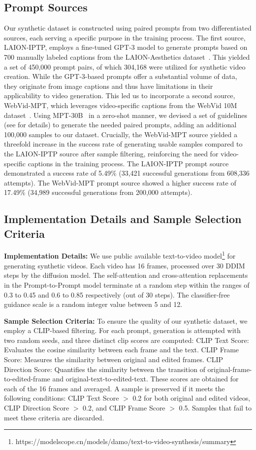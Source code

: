 \subsection{Prompt Sources} 
Our synthetic dataset is constructed using paired prompts from two differentiated sources, each serving a specific purpose in the training process. The first source, LAION-IPTP, employs a fine-tuned GPT-3 model to generate prompts based on 700 manually labeled captions from the LAION-Aesthetics dataset~\cite{brooks2023instructpix2pix}. This yielded a set of 450,000 prompt pairs, of which 304,168 were utilized for synthetic video creation. While the GPT-3-based prompts offer a substantial volume of data, they originate from image captions and thus have limitations in their applicability to video generation. This led us to incorporate a second source, WebVid-MPT, which leverages video-specific captions from the WebVid 10M dataset~\cite{webvid}. Using MPT-30B~\cite{mpt} in a zero-shot manner, we devised a set of guidelines (see  for details) to generate the needed paired prompts, adding an additional 100,000 samples to our dataset. Crucially, the WebVid-MPT source yielded a threefold increase in the success rate of generating usable samples compared to the LAION-IPTP source after sample filtering, reinforcing the need for video-specific captions in the training process. The LAION-IPTP prompt source demonstrated a success rate of 5.49\% (33,421 successful generations from 608,336 attempts). The WebVid-MPT prompt source showed a higher success rate of 17.49\% (34,989 successful generations from 200,000 attempts).

\subsection{Implementation Details and Sample Selection Criteria} 
\noindent\textbf{Implementation Details:} We use public available text-to-video model\footnote{https://modelscope.cn/models/damo/text-to-video-synthesis/summary} for generating synthetic videos. Each video has 16 frames, processed over 30 DDIM~\cite{ddim} steps by the diffusion model. The self-attention and cross-attention replacements in the Prompt-to-Prompt model terminate at a random step within the ranges of 0.3 to 0.45 and 0.6 to 0.85 respectively (out of 30 steps). The classifier-free guidance scale is a random integer value between 5 and 12.

\noindent\textbf{Sample Selection Criteria:} To ensure the quality of our synthetic dataset, we employ a CLIP-based filtering. For each prompt, generation is attempted with two random seeds, and three distinct clip scores are computed: CLIP Text Score: Evaluates the cosine similarity between each frame and the text.
CLIP Frame Score: Measures the similarity between original and edited frames.
CLIP Direction Score: Quantifies the similarity between the transition of original-frame-to-edited-frame and original-text-to-edited-text.
These scores are obtained for each of the 16 frames and averaged. A sample is preserved if it meets the following conditions: CLIP Text Score $>$ 0.2 for both original and edited videos, CLIP Direction Score $>$ 0.2, and CLIP Frame Score $>$ 0.5. Samples that fail to meet these criteria are discarded.


